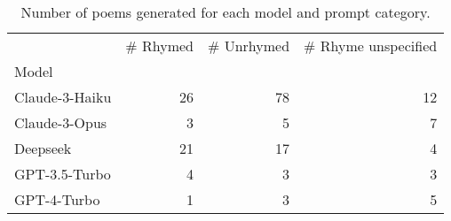 \begin{table}[H]
  \centering
  \small
  \singlespacing
  \begin{tabular}{lrrr}
  \toprule
   & \# Rhymed & \# Unrhymed & \# Rhyme unspecified \\
  Model &  &  &  \\
  \midrule
  Claude-3-Haiku & 26 & 78 & 12 \\
  Claude-3-Opus & 3 & 5 & 7 \\
  Deepseek & 21 & 17 & 4 \\
  GPT-3.5-Turbo & 4 & 3 & 3 \\
  GPT-4-Turbo & 1 & 3 & 5 \\
  \bottomrule
  \end{tabular}
  \caption{Number of poems generated for each model and prompt category.}
  \label{tab:num_poems_models}
\end{table}